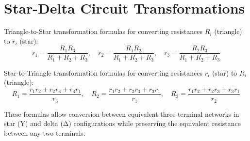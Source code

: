 \documentclass{article}
\begin{document}
\section*{Star-Delta Circuit Transformations}

Triangle-to-Star transformation formulas for converting resistances $R_i$ (triangle) to $r_i$ (star):
\[
r_1 = \frac{R_1R_3}{R_1 + R_2 + R_3}, \quad
r_2 = \frac{R_1R_2}{R_1 + R_2 + R_3}, \quad
r_3 = \frac{R_2R_3}{R_1 + R_2 + R_3}
\]

Star-to-Triangle transformation formulas for converting resistances $r_i$ (star) to $R_i$ (triangle):
\[
R_1 = \frac{r_1r_2 + r_2r_3 + r_3r_1}{r_3}, \quad
R_2 = \frac{r_1r_2 + r_2r_3 + r_3r_1}{r_1}, \quad
R_3 = \frac{r_1r_2 + r_2r_3 + r_3r_1}{r_2}
\]

These formulas allow conversion between equivalent three-terminal networks in star (Y) and delta (Δ) configurations while preserving the equivalent resistance between any two terminals.
\end{document}
